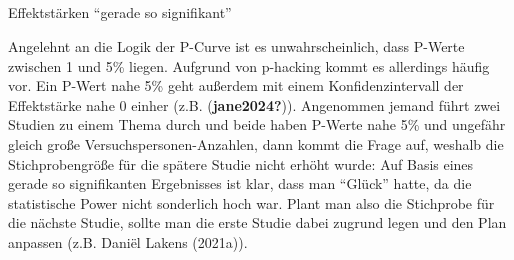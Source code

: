 \documentclass[
  letterpaper,
  DIV=11,
  numbers=noendperiod]{scrreprt}
\makeatletter
\let\oldsubparagraph\subparagraph
\renewcommand{\subparagraph}{
    \@ifstar
      \xxxSubParagraphStar
      \xxxSubParagraphNoStar
  }
\newcommand{\xxxSubParagraphStar}[1]{\oldsubparagraph*{#1}\mbox{}}
\newcommand{\xxxSubParagraphNoStar}[1]{\oldsubparagraph{#1}\mbox{}}
\newenvironment{Shaded}{\begin{snugshade}}{\end{snugshade}}
\newcommand{\AttributeTok}[1]{\textcolor[rgb]{0.40,0.45,0.13}{#1}}
\newcommand{\CommentTok}[1]{\textcolor[rgb]{0.37,0.37,0.37}{#1}}
\newcommand{\ControlFlowTok}[1]{\textcolor[rgb]{0.00,0.23,0.31}{\textbf{#1}}}
\newcommand{\DecValTok}[1]{\textcolor[rgb]{0.68,0.00,0.00}{#1}}
\newcommand{\FunctionTok}[1]{\textcolor[rgb]{0.28,0.35,0.67}{#1}}
\newcommand{\NormalTok}[1]{\textcolor[rgb]{0.00,0.23,0.31}{#1}}
\newcommand{\OtherTok}[1]{\textcolor[rgb]{0.00,0.23,0.31}{#1}}
\newcommand{\SpecialCharTok}[1]{\textcolor[rgb]{0.37,0.37,0.37}{#1}}
\newcommand{\StringTok}[1]{\textcolor[rgb]{0.13,0.47,0.30}{#1}}
\makeatother
\begin{document}
\subparagraph{Effektstärken ``gerade so
signifikant''}\label{effektstuxe4rken-gerade-so-signifikant}

Angelehnt an die Logik der P-Curve ist es unwahrscheinlich, dass P-Werte
zwischen 1 und 5\% liegen. Aufgrund von p-hacking kommt es allerdings
häufig vor. Ein P-Wert nahe 5\% geht außerdem mit einem
Konfidenzintervall der Effektstärke nahe 0 einher (z.B.
(\textbf{jane2024?})). Angenommen jemand führt zwei Studien zu einem
Thema durch und beide haben P-Werte nahe 5\% und ungefähr gleich große
Versuchspersonen-Anzahlen, dann kommt die Frage auf, weshalb die
Stichprobengröße für die spätere Studie nicht erhöht wurde: Auf Basis
eines gerade so signifikanten Ergebnisses ist klar, dass man ``Glück''
hatte, da die statistische Power nicht sonderlich hoch war. Plant man
also die Stichprobe für die nächste Studie, sollte man die erste Studie
dabei zugrund legen und den Plan anpassen (z.B. Daniël Lakens (2021a)).

\begin{Shaded}
\end{Shaded}
\end{document}
